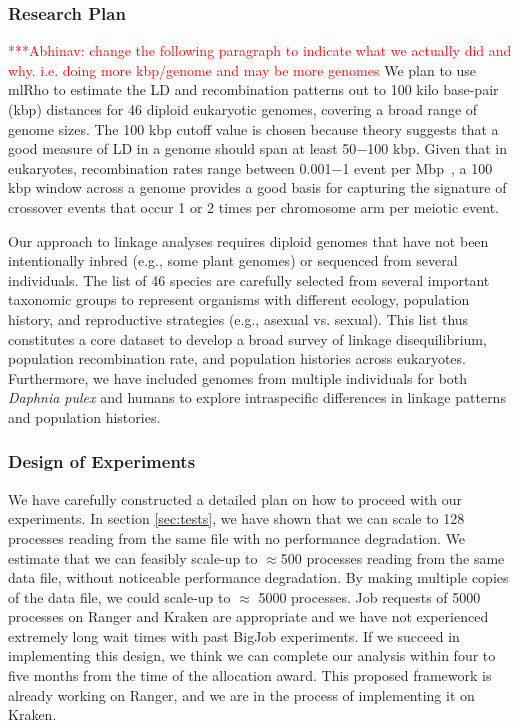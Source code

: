 \documentclass{sig-alternate}
\newcommand{\abhi}[1]{ {\textcolor{red} { ***Abhinav: #1 }}}
\newcommand{\abhi}[1]{ {}}
\begin{document}
\subsubsection{Research Plan}\label{sec:plan}

\abhi{change the following paragraph to indicate what we actually did and why. i.e. doing more kbp/genome and may be more genomes}
We plan to use mlRho to estimate the LD and recombination patterns out to 100 kilo base-pair (kbp) distances for 46 diploid eukaryotic genomes, covering a broad range of genome sizes.%
The 100 kbp cutoff value is chosen because theory suggests that a good measure
of LD in a genome should span at least 50$-$100 kbp. Given that in eukaryotes, recombination rates range
between 0.001$-$1 event per Mbp~\cite{annurev-genom-082410-101412}, a 100 kbp window across a genome provides
a good basis for capturing the signature of crossover events that occur 1 or 2 times per chromosome arm per
meiotic event.

Our approach to linkage analyses requires diploid genomes that have not been intentionally inbred  (e.g., some plant genomes) or sequenced from several individuals. The list of 46 species are carefully selected from several important taxonomic groups to represent organisms with different ecology, population history, and reproductive strategies  (e.g., asexual vs. sexual). This list  thus constitutes a core dataset to develop a broad survey of linkage disequilibrium, population recombination rate, and population histories across eukaryotes. Furthermore, we have included genomes from multiple individuals for both {\it Daphnia pulex} and humans to explore intraspecific differences in linkage patterns and population histories. 

\subsubsection{Design of Experiments}
We have carefully constructed a detailed plan on how to proceed with our experiments. In section \ref{sec:tests}, we have shown that we can scale to 128 processes reading from the same file with no performance degradation. We estimate that we can feasibly scale-up to $\approx$500 processes reading from the same data file, without noticeable performance degradation. By making multiple copies of the data file, we could scale-up to $\approx$ 5000 processes. Job requests of 5000 processes on Ranger and Kraken are appropriate and we have not experienced extremely long wait times with past BigJob experiments. If we succeed in implementing this design, we think we can complete our analysis within four to five months from the time of the allocation award. This proposed framework is already working on Ranger, and we are in the process of implementing it on Kraken. 
\end{document}

